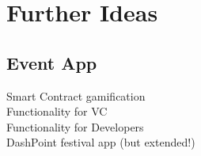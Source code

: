 \section{Further Ideas}

\subsection{Event App}
Smart Contract gamification\\
Functionality for VC\\
Functionality for Developers\\
DashPoint festival app (but extended!)
